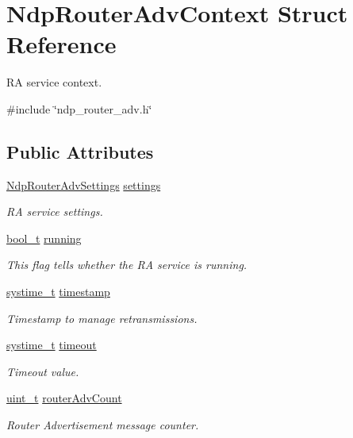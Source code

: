 \hypertarget{structNdpRouterAdvContext}{}\section{Ndp\+Router\+Adv\+Context Struct Reference}
\label{structNdpRouterAdvContext}


RA service context.  




{\ttfamily \#include \char`\"{}ndp\+\_\+router\+\_\+adv.\+h\char`\"{}}

\subsection*{Public Attributes}
\begin{DoxyCompactItemize}
\item 
\hyperlink{structNdpRouterAdvSettings}{Ndp\+Router\+Adv\+Settings} \hyperlink{structNdpRouterAdvContext_ac0f413b02fb1832bc4fb85c133784033}{settings}
\begin{DoxyCompactList}\small\item\em RA service settings. \end{DoxyCompactList}\item 
\hyperlink{compiler__port_8h_a812d16e5494522586b3784e55d479912}{bool\+\_\+t} \hyperlink{structNdpRouterAdvContext_a256316b87afc01c4cdc02edb941c7284}{running}
\begin{DoxyCompactList}\small\item\em This flag tells whether the RA service is running. \end{DoxyCompactList}\item 
\hyperlink{compiler__port_8h_ae3e32a98d431a02106616da3071832dd}{systime\+\_\+t} \hyperlink{structNdpRouterAdvContext_a04f8a4915f483d48dcc52bdadf0785c2}{timestamp}
\begin{DoxyCompactList}\small\item\em Timestamp to manage retransmissions. \end{DoxyCompactList}\item 
\hyperlink{compiler__port_8h_ae3e32a98d431a02106616da3071832dd}{systime\+\_\+t} \hyperlink{structNdpRouterAdvContext_a7df6bf4f325f1f942f9d312d0b08ee39}{timeout}
\begin{DoxyCompactList}\small\item\em Timeout value. \end{DoxyCompactList}\item 
\hyperlink{compiler__port_8h_a12a1e9b3ce141648783a82445d02b58d}{uint\+\_\+t} \hyperlink{structNdpRouterAdvContext_a60ba076474e519acc836ce7ad891ddf8}{router\+Adv\+Count}
\begin{DoxyCompactList}\small\item\em Router Advertisement message counter. \end{DoxyCompactList}\end{DoxyCompactItemize}


